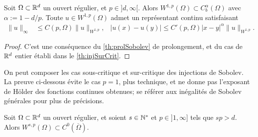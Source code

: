 \begin{corollary}
\label{corol:injSurCritOm}
%
Soit $\Omega \subset \mathbb{R}^d$ un ouvert régulier, et $p\in ]d,\infty[$. Alors $W^{1,p}(\Omega) \subset C^\alpha_b(\Omega)$ avec $\alpha := 1-d/p$.
Toute $u\in W^{1,p}(\Omega)$ admet un représentant continu satisfaisant
\begin{align*}
	\|u\|_\infty &\leq C(p,\Omega) \|u\|_{W^{1,p}},&
	|u(x)-u(y)| \leq C'(p,\Omega) |x-y|^\alpha \|u\|_{W^{1,p}}.
\end{align*}
\end{corollary}

\begin{proof}
	C'est une conséquence du \cref{th:prolSobolev} de prolongement, et du cas de $\mathbb{R}^d$ entier établi dans le \cref{th:injSurCrit}.
\end{proof}




On peut composer les cas sous-critique et sur-critique des injections de Sobolev. 
La preuve ci-dessous évite le cas $p=1$, plus technique, et ne donne pas l'exposant de Hölder des fonctions continues obtenues; se référer aux inégalités de Sobolev générales pour plus de précisions.

\begin{remark}
\label{rem:SobSurCritIter}
Soit $\Omega \subset \mathbb{R}^d$ un ouvert régulier, et soient $s \in \mathbb{N}^*$ et $p \in ]1,\infty]$ tels que $s p  > d$. Alors $W^{s,p}(\Omega) \subset C^0(\overline \Omega)$. 
\end{remark}

